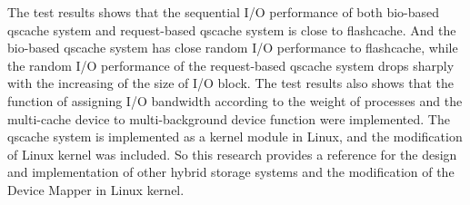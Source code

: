 \begin{englishabstract}
The test results shows that the sequential I/O performance of both bio-based qscache system and request-based qscache system is close to flashcache. And the bio-based qscache system has close random I/O performance to flashcache, while the random I/O performance of the request-based qscache system drops sharply with the increasing of the size of I/O block. The test results also shows that the function of assigning I/O bandwidth according to the weight of processes and the multi-cache device to multi-background device function were implemented. The qscache system is implemented as a kernel module in Linux, and the modification of Linux kernel was included. So this research provides a reference for the design and implementation of other hybrid storage systems and the modification of the Device Mapper in Linux kernel.

\end{englishabstract}

